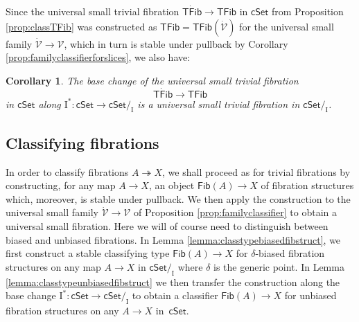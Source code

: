 \documentclass[11pt,reqno]{amsart}
\newcommand{\cSet}{\ensuremath{\mathsf{cSet}}}
\newcommand{\slice}[1]{\ensuremath{/_{\!{#1}}}}
\newcommand{\ra}{\ensuremath{\rightarrow}}
\newcommand{\fib}{\ensuremath{\twoheadrightarrow}}
\renewcommand{\to}{\ensuremath{\rightarrow}}
\newcommand{\I}{\ensuremath{\mathrm{I}}}
\newcommand{\V}{\ensuremath{\mathcal{V}}}
\newcommand{\VV}{\ensuremath{\dot{\mathcal{V}}}}
\newcommand{\Fib}{\ensuremath{\mathsf{Fib}}}
\newcommand{\TFib}{\ensuremath{\mathsf{TFib}}}
\newcommand{\TTFib}{\ensuremath{\dot{\mathsf{TFib}}}}
\newtheorem{lemma}[theorem]{Lemma}
\newtheorem{corollary}[theorem]{Corollary}
\theoremstyle{remark}
\theoremstyle{definition}
\begin{document}
%

Since the universal small trivial fibration $\TTFib\ra\TFib$ in $\cSet$ from Proposition \ref{prop:classTFib} was constructed as $\TFib = \TFib(\VV)$ for the universal small family $\VV\to \V$, which in turn is stable under pullback by Corollary \ref{prop:familyclassifierforslices}, we also have: 

\begin{corollary}\label{por:classTFibslice}
The base change of the universal small trivial fibration  
\[
\TTFib\ra\TFib
\]
in $\cSet$ along $\I^* : \cSet \to \cSet\slice{\I}$ is a universal small trivial fibration in $\cSet\slice{\I}$.
\end{corollary}

\subsection*{Classifying fibrations}\label{sec:universalfibration}

In order to classify fibrations $A\fib X$, we shall proceed as for trivial fibrations by constructing, for any map $A\ra X$, an object $\Fib(A)\to X$ of fibration structures which, moreover, is stable under pullback.  We then apply the construction to the universal small family $\VV\ra\V$ of Proposition \ref{prop:familyclassifier} to obtain a universal small fibration.    Here we will of course need to distinguish between biased and unbiased fibrations.  In Lemma \ref{lemma:classtypebiasedfibstruct}, we first construct a stable classifying type $\Fib(A)\ra X$ for $\delta$-biased fibration structures on any map $A\to X$ in $\cSet\slice{\I}$ where $\delta$ is the generic point.    In Lemma \ref{lemma:classtypeunbiasedfibstruct}
we then transfer the construction along the base change $\I^* : \cSet \to \cSet\slice{\I}$ to obtain a classifier $\Fib(A)\ra X$ for unbiased fibration structures on any $A\to X$ in~$\cSet$.
\end{document}
